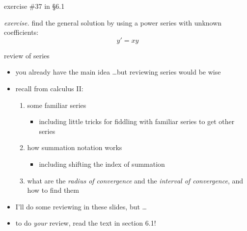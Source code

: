 \documentclass[dvipsnames,colorlinks]{beamer}
\begin{document}
\begin{frame}{exercise \#37 in \S 6.1}

\noindent \emph{exercise.}  find the general solution by using a power series with unknown coefficients:
    $$y'=xy$$

\vspace{70mm}
\end{frame}


\begin{frame}{review of series}

\begin{itemize}
\item you already have the main idea \dots but reviewing series would be wise
\item recall from calculus II:

    \begin{enumerate}
    \item some familiar series
        \begin{itemize}
        \item including little tricks for fiddling with familiar series to get other series
        \end{itemize}
    \item how summation notation works
        \begin{itemize}
        \item including shifting the index of summation
        \end{itemize}
    \item what are the \emph{radius of convergence} and the \emph{interval of convergence}, and how to find them
    \end{enumerate}

\bigskip
\item I'll do some reviewing in these slides, but \dots
\item to do \emph{your} review, \alert{read the text in section 6.1!}
\end{itemize}
\end{frame}
\end{document}
